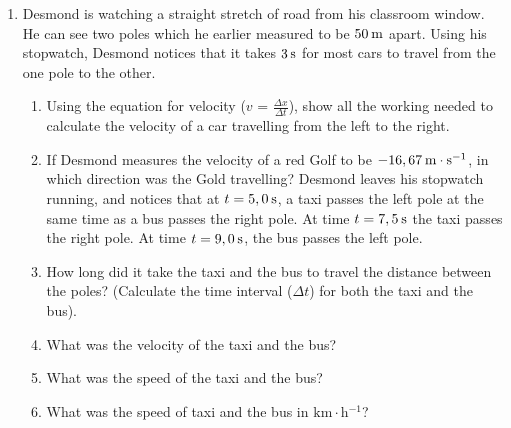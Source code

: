 \begin{enumerate}[noitemsep, label=\textbf{\arabic*}. ]
    \addtocounter{footnote}{-0}
            \label{m38791*uid44}\item Desmond is watching a straight stretch of road from his classroom window. He can see two poles which he earlier measured to be \begin{math}50\phantom{\rule{2pt}{0ex}}\mathrm{m}\end{math} apart. Using his stopwatch, Desmond notices that it takes \begin{math}3\phantom{\rule{2pt}{0ex}}\mathrm{s}\end{math} for most cars to travel from the one pole to the other.
\label{m38791*id66815}\begin{enumerate}[noitemsep, label=\textbf{\alph*}. ] 
            \label{m38791*uid45}\item Using the equation for velocity (\begin{math}v\end{math} = \begin{math}\frac{\Delta x}{\Delta t}\end{math}), show all the working needed to calculate the velocity of a car travelling from the left to the right.
\label{m38791*uid46}\item If Desmond measures the velocity of a red Golf to be \begin{math}-16,67\phantom{\rule{2pt}{0ex}}\mathrm{m}\ensuremath{\cdot}\mathrm{s}{}^{-1}\end{math}, in which direction was the Gold travelling?
Desmond leaves his stopwatch running, and notices that at \begin{math}t=5,0\phantom{\rule{2pt}{0ex}}\mathrm{s}\end{math}, a taxi passes the left pole at the same time as a bus passes the right pole. At time \begin{math}t=7,5\phantom{\rule{2pt}{0ex}}\mathrm{s}\end{math} the taxi passes the right pole. At time \begin{math}t=9,0\phantom{\rule{2pt}{0ex}}\mathrm{s}\end{math}, the bus passes the left pole.
\label{m38791*uid47}\item How long did it take the taxi and the bus to travel the distance between the poles?
(Calculate the time interval (\begin{math}\Delta t\end{math}) for both the taxi and the bus).
\label{m38791*uid48}\item What was the velocity of the taxi and the bus?
\label{m38791*uid49}\item What was the speed of the taxi and the bus?
\label{m38791*uid50}\item What was the speed of taxi and the bus in \begin{math}\mathrm{km}\ensuremath{\cdot}\mathrm{h}{}^{-1}\end{math}?
\end{enumerate}
        

\end{enumerate}
